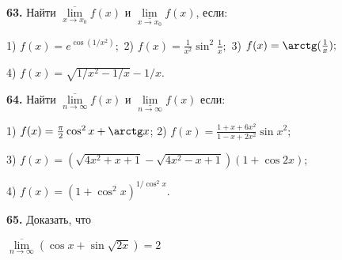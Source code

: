 \documentclass[11pt, a4paper]{article}
\begin{document}
	\textbf{63.} Найти $\underset{x \to x_0}{\overline{\lim}} f(x)$ и $\underset{x \to x_0}{\underline{\lim}} f(x)$, если:

	1) $f(x) = e^{\cos(1/x^2)};$ \hspace{0.1cm}
	2) $f(x) = \frac{1}{x^2} \sin^2\frac{1}{x};$ \hspace{0.1cm}
	3) $f(x) = \arctg(\frac{1}{x});$
	
	4) $f(x) = \sqrt{1/x^2 - 1/x} - 1/x.$

	\textbf{64.} Найти  $\underset{n \to \infty}{\overline{\lim}} f(x)$ и $\underset{n \to \infty}{\underline{\lim}} f(x)$ если:



	1) $f(x) = \frac{\pi}{2} \cos^2 x + \arctg x$; \hspace{0.1cm}
	2) $f(x) = \frac{1 + x + 6x^2}{1 - x + 2x^2} \sin x^2$;
	
	3) $f(x) = (\sqrt{4x^2 + x + 1} - \sqrt{4x^2 - x +1})(1+\cos 2x)$;
	
	4) $f(x)= (1+\cos^2 x)^{1/\cos^2 x}$.


	\textbf{65.} Доказать, что  
	\begin{center}
		$\underset{n \to \infty}{\overline{\lim}} (\cos{x}+\sin{\sqrt{2x}}) = 2$
	\end{center}
	
	
\end{document}
